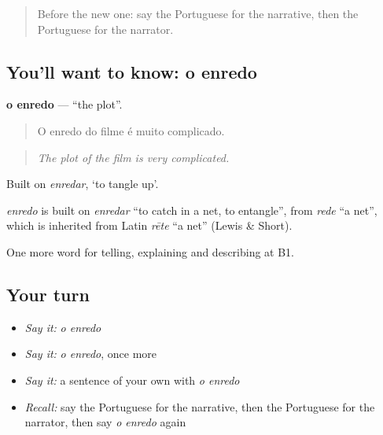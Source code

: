 \label{lesson:PT-C324-enredo}



\begin{quote}
Before the new one: say the Portuguese for the narrative, then the Portuguese for the narrator.
\end{quote}

\subsection*{You'll want to know: o enredo}
\textbf{o enredo} — \textquotedblleft{}the plot\textquotedblright{}.

\begin{quote}
O enredo do filme é muito complicado.
\end{quote}

\begin{quote}
\emph{The plot of the film is very complicated.}
\end{quote}

Built on \emph{enredar}, ‘to tangle up’.

\begin{cousinweb}
\emph{enredo} is built on \emph{enredar} \textquotedblleft{}to catch in a net, to entangle\textquotedblright{}, from \emph{rede} \textquotedblleft{}a net\textquotedblright{}, which is inherited from Latin \emph{rēte} \textquotedblleft{}a net\textquotedblright{} (Lewis \& Short).
\end{cousinweb}

\begin{grammarlens}[title={What you've built}]
One more word for telling, explaining and describing at B1.
\end{grammarlens}

\subsection*{Your turn}
\begin{itemize}
\raggedright
  \item \emph{Say it:} \emph{o enredo}
  \item \emph{Say it:} \emph{o enredo}, once more
  \item \emph{Say it:} a sentence of your own with \emph{o enredo}
  \item \emph{Recall:} say the Portuguese for the narrative, then the Portuguese for the narrator, then say \emph{o enredo} again
\end{itemize}

